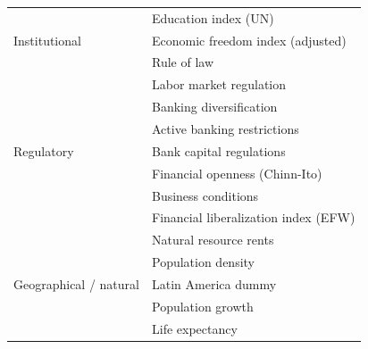 \documentclass[a4paper,11pt]{article}
\begin{document}
\begin{table}[ht!]
\begin{tabular}{ll}
  \midrule
  \multirow{3}{*}{Institutional}  & Education index (UN) \\
                & Economic freedom index (adjusted) \\
                & Rule of law \\

  \midrule
  \multirow{7}{*}{Regulatory}  & Labor market regulation \\
                & Banking diversification \\
                & Active banking restrictions \\
                & Bank capital regulations \\
                & Financial openness (Chinn-Ito) \\
                & Business conditions \\
                & Financial liberalization index (EFW) \\
 
  \midrule
  \multirow{5}{*}{Geographical / natural} & Natural resource rents \\
                                & Population density \\
                                & Latin America dummy \\
                                & Population growth \\
                                & Life expectancy \\
  \bottomrule
\end{tabular}
\end{table}
\clearpage
\end{document}
